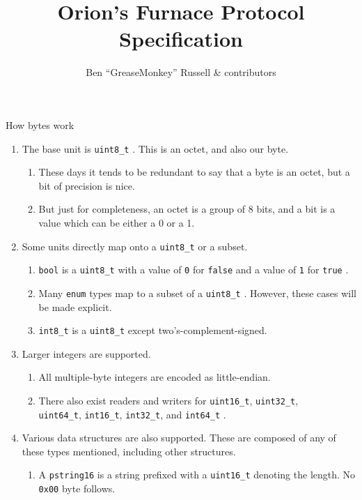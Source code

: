 \documentclass[a4paper,draft]{article}
\title{Orion's Furnace Protocol Specification}
\author{Ben ``GreaseMonkey'' Russell \& contributors}
\begin{document}
\setlength{\parskip}{0.5\baselineskip}
\maketitle

\tableofcontents
\clearpage

\begin{section}{How bytes work}
  \begin{enumerate}
    \item The base unit is \texttt{uint8\_t} . This is an octet, and also our byte.
    \begin{enumerate}
      \item These days it tends to be redundant to say that a byte is an octet, but a bit of precision is nice.
      \item But just for completeness, an octet is a group of 8 bits, and a bit is a value which can be either a 0 or a 1.
    \end{enumerate}

    \item Some units directly map onto a \texttt{uint8\_t} or a subset.
    \begin{enumerate}
      \item \texttt{bool} is a \texttt{uint8\_t} with a value of \texttt{0} for \texttt{false} and a value of \texttt{1} for \texttt{true} .
      \item Many \texttt{enum} types map to a subset of a \texttt{uint8\_t} . However, these cases will be made explicit.
      \item \texttt{int8\_t} is a \texttt{uint8\_t} except two's-complement-signed.
    \end{enumerate}

    \item Larger integers are supported.
    \begin{enumerate}
      \item All multiple-byte integers are encoded as little-endian.
      \item There also exist readers and writers for \texttt{uint16\_t}, \texttt{uint32\_t}, \\
        \texttt{uint64\_t}, \texttt{int16\_t}, \texttt{int32\_t}, and \texttt{int64\_t} .
    \end{enumerate}

    \item Various data structures are also supported. These are composed of any of these types mentioned, including other structures.
    \begin{enumerate}
      \item A \texttt{pstring16} is a string prefixed with a \texttt{uint16\_t} denoting the length. No \texttt{0x00} byte follows.
    \end{enumerate}


\end{enumerate}
\end{section}
\end{document}
